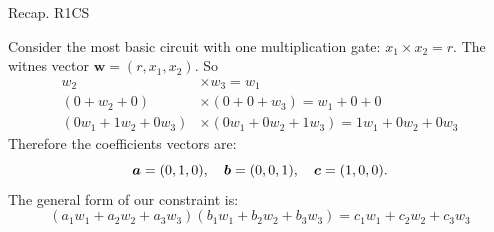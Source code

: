 \documentclass{zkdl-presentation-template}
\begin{document}
    \begin{frame}{Recap. R1CS}
        \begin{example}
            Consider the most basic circuit with one multiplication gate: $x_1 \times x_2 = r$.
            The witnes vector $\boldsymbol{w} = (r, x_1, x_2)$. So
            \vspace{-5pt}
            \begin{align*}
                w_2 &\times w_3 = w_1 \\
                (0 + w_2 + 0) &\times (0 + 0 + w_3) = w_1 + 0 + 0 \\
                (0w_1 + 1w_2 + 0w_3) &\times (0w_1 + 0w_2 + 1w_3) = 1w_1 + 0w_2 + 0w_3
            \end{align*}
            Therefore the coefficients vectors are:
            \vspace{-5pt}
            \begin{equation*}
                \boldsymbol{a} = (0, 1, 0), \quad \boldsymbol{b} = (0, 0, 1), \quad \boldsymbol{c} = (1, 0, 0). 
                \vspace{-5pt}
            \end{equation*}
            The general form of our constraint is:
            \vspace{-5pt}
            \begin{equation*}
                (a_1w_1 + a_2w_2 + a_3w_3)(b_1w_1 + b_2w_2 + b_3w_3) = c_1w_1 + c_2w_2 + c_3w_3
            \end{equation*}
        \end{example}
    \end{frame}
\end{document}
